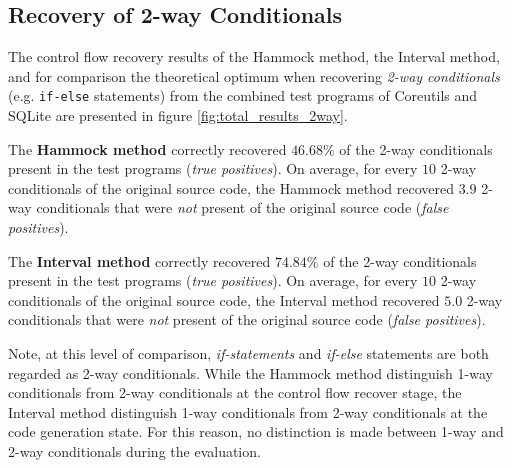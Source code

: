 
\subsection{Recovery of 2-way Conditionals}
\label{sec:recovery_of_2way_conditionals}

The control flow recovery results of the Hammock method, the Interval method, and for comparison the theoretical optimum when recovering \textit{2-way conditionals} (e.g. \texttt{if-else} statements) from the combined test programs of Coreutils and SQLite are presented in figure \ref{fig:total_results_2way}.

The \textbf{Hammock method} correctly recovered $46.68\%$ of the 2-way conditionals present in the test programs (\textit{true positives}). On average, for every $10$ 2-way conditionals of the original source code, the Hammock method recovered $3.9$ 2-way conditionals that were \textit{not} present of the original source code (\textit{false positives}).

The \textbf{Interval method} correctly recovered $74.84\%$ of the 2-way conditionals present in the test programs (\textit{true positives}). On average, for every $10$ 2-way conditionals of the original source code, the Interval method recovered $5.0$ 2-way conditionals that were \textit{not} present of the original source code (\textit{false positives}).

Note, at this level of comparison, \textit{if-statements} and \textit{if-else} statements are both regarded as 2-way conditionals. While the Hammock method distinguish 1-way conditionals from 2-way conditionals at the control flow recover stage, the Interval method distinguish 1-way conditionals from 2-way conditionals at the code generation state. For this reason, no distinction is made between 1-way and 2-way conditionals during the evaluation.


